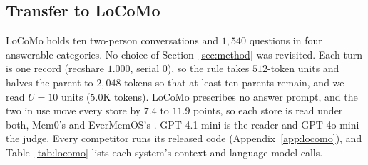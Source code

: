\documentclass{article}
\newcommand{\serial}{\textsf{serial}}
\newcommand{\cov}{\textsf{recshare}}
\begin{document}
\subsection{Transfer to LoCoMo}\label{sec:locomo}

LoCoMo \cite{locomo} holds ten two-person conversations and $1{,}540$ questions in four answerable categories. No choice of Section~\ref{sec:method} was revisited. Each turn is one record (\cov{} $1.000$, \serial{} $0$), so the rule takes $512$-token units and halves the parent to $2{,}048$ tokens so that at least ten parents remain, and we read $U{=}10$ units ($5.0$K tokens). LoCoMo prescribes no answer prompt, and the two in use move every store by $7.4$ to $11.9$ points, so each store is read under both, Mem0's \cite{mem0} and EverMemOS's \cite{evermemos}. GPT-4.1-mini \cite{gpt41} is the reader and GPT-4o-mini \cite{gpt4omini} the judge. Every competitor runs its released code (Appendix~\ref{app:locomo}), and Table~\ref{tab:locomo} lists each system's context and language-model calls.
\end{document}
